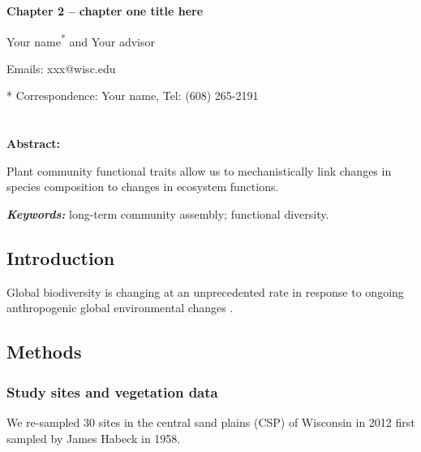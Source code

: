 \clearpage
{}

\resetlinenumber

\begin{center}
\textbf{\Large{}Chapter 2 -- chapter one title here}
\label{chap:chapter2}
\par\end{center}{\Large \par}

\bigskip{}


\begin{center}
Your name\textsuperscript{*} and Your advisor
\par\end{center}

\bigskip{}


Emails: xxx@wisc.edu

{*} Correspondence: Your name, Tel: (608) 265-2191

\chapter*{}
\setcounter{chapter}{2}


\textbf{Abstract:}

Plant community functional traits allow us to mechanistically link changes in species composition to changes in ecosystem functions.

\textbf{\emph{Keywords:}} long-term community assembly; functional
diversity.

\clearpage{}

\section*{Introduction}

Global biodiversity is changing at an unprecedented rate in response to ongoing anthropogenic global environmental changes \citep{sala2000biodiversity}.

\section*{Methods}
\subsection*{Study sites and vegetation data}
We re-sampled 30 sites in the central sand plains (CSP) of Wisconsin in 2012 first sampled by James Habeck in 1958.

